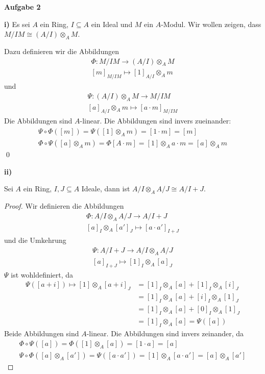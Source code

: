 \documentclass{article}
\theoremstyle{definition}
\theoremstyle{plain}
\theoremstyle{remark}
\newcommand{\aufgabe}[1]{
	{
		\vspace*{0.5cm}
		\textsf{\textbf{Aufgabe #1}}
		\vspace*{0.2cm}

	}
}
\newcommand{\teilaufgabe}[1]{
	{
		\vspace*{0.2cm}
		\textsf{\textbf{#1)}}
	}
}
\begin{document}
\aufgabe2
\teilaufgabe{i} Es sei $A$ ein Ring, $I\subseteq A$ ein Ideal und $M$ ein $A$-Modul. Wir wollen zeigen, dass $M/IM\cong (A/I)\otimes_A M$.

Dazu definieren wir die Abbildungen
\begin{align}
	\Phi:M/IM\to(A/I)\otimes_A M \\
	[m]_{M/IM}\mapsto [1]_{A/I}\otimes_A m
\end{align}
und 
\begin{align}
	\Psi:(A/I)\otimes_A M\to M/IM\\
	[a]_{A/I}\otimes_A m \mapsto [a\cdot m]_{M/IM}
\end{align}
Die Abbildungen sind $A$-linear.
 Die Abbildungen sind invers zueinander:
 \begin{align}
	 \Psi\circ\Phi([m])=\Psi([1]\otimes_Am)=[1\cdot m]=[m] \\
	 \Phi\circ\Psi([a]\otimes_Am)=\Phi[A\cdot m]=[1]\otimes_Aa\cdot m=[a]\otimes_A m
 \end{align} \qed

 \teilaufgabe{ii}
Sei $A$ ein Ring, $I,J\subseteq A$ Ideale, dann ist $A/I\otimes_A A/J\cong A/I+J$.
\begin{proof}
	Wir definieren die Abbildungen
	\begin{align}
		\Phi:A/I\otimes_AA/J\to A/I+J \\
		[a]_I\otimes_A[a']_J\mapsto [a\cdot a']_{I+J}
	\end{align}
und die Umkehrung 
\begin{align}
	\Psi:A/I+J\to A/I\otimes_AA/J\\
	[a]_{I+J}\mapsto[1]_I\otimes_A[a]_J
\end{align}
$\Psi$ ist wohldefiniert, da 
\begin{align}
	\Psi([a+i])\mapsto[1]\otimes_A[a+i]_J&=[1]_I\otimes_A[a]+[1]_I\otimes_A[i]_J\\ 
					     &=[1]_I\otimes_A[a]+[i]_I\otimes_A[1]_J\\
					     &=[1]_I\otimes_A[a]+[0]_I\otimes_A[1]_J\\
					     &=[1]_I\otimes_A[a] 
					     = \Psi([a])
\end{align}
Beide Abbildungen sind $A$-linear.
Die Abbildungen sind invers zeinander, da
\begin{align}
	\Phi\circ\Psi ([a])=\Phi([1]\otimes_A[a])=[1\cdot a]=[a] \\
	\Psi\circ\Phi([a]\otimes_A[a'])=\Psi([a\cdot a'])=[1]\otimes_A [a\cdot a']=[a]\otimes_A [a']
\end{align}
\end{proof}
\end{document}
